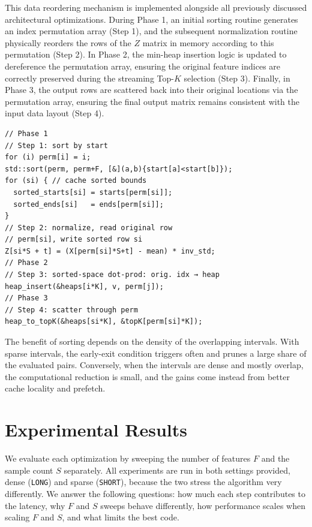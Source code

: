 \documentclass[letterpaper]{article}
\begin{document}
This data reordering mechanism is implemented alongside all previously discussed architectural optimizations.
During Phase 1, an initial sorting routine generates an index permutation array (Step 1), and the subsequent normalization routine physically reorders the rows of the $Z$ matrix in memory according to this permutation (Step 2).
In Phase 2, the min-heap insertion logic is updated to dereference the permutation array, ensuring the original feature indices are correctly preserved during the streaming Top-$K$ selection (Step 3).
Finally, in Phase 3, the output rows are scattered back into their original locations via the permutation array, ensuring the final output matrix remains consistent with the input data layout (Step 4).

{\fontsize{8}{10}\selectfont
\begin{Verbatim}
// Phase 1
// Step 1: sort by start
for (i) perm[i] = i;
std::sort(perm, perm+F, [&](a,b){start[a]<start[b]});
for (si) { // cache sorted bounds
  sorted_starts[si] = starts[perm[si]];
  sorted_ends[si]   = ends[perm[si]];
}
// Step 2: normalize, read original row
// perm[si], write sorted row si
Z[si*S + t] = (X[perm[si]*S+t] - mean) * inv_std;
// Phase 2
// Step 3: sorted-space dot-prod: orig. idx → heap
heap_insert(&heaps[i*K], v, perm[j]);
// Phase 3
// Step 4: scatter through perm
heap_to_topK(&heaps[si*K], &topK[perm[si]*K]);
\end{Verbatim}
}

The benefit of sorting depends on the density of the overlapping intervals.
With sparse intervals, the early-exit condition triggers often and prunes a large share of the evaluated pairs.
Conversely, when the intervals are dense and mostly overlap, the computational reduction is small, and the gains come instead from better cache locality and prefetch.


\section{Experimental Results}\label{sec:exp}
We evaluate each optimization by sweeping the number of features $F$ and the sample count $S$ separately. All experiments are run in both settings provided, dense (\texttt{LONG}) and sparse (\texttt{SHORT}), because the two stress the algorithm very differently. We answer the following questions: how much each step contributes to the latency, why $F$ and $S$ sweeps behave differently, how performance scales when scaling $F$ and $S$, and what limits the best code.
\end{document}
